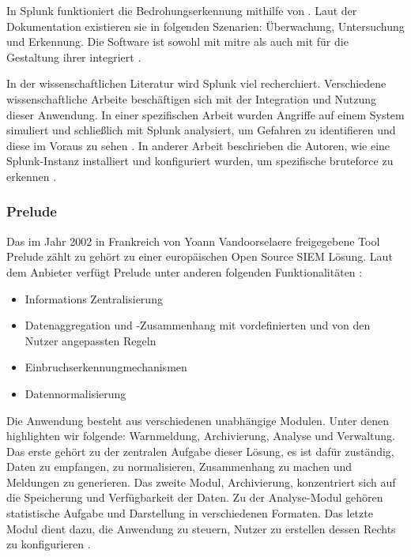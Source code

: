 In Splunk funktioniert die Bedrohungserkennung mithilfe von . Laut der Dokumentation existieren sie in folgenden Szenarien: Überwachung, Untersuchung und Erkennung. Die Software ist sowohl mit \gls{mitre} als auch mit  für die Gestaltung ihrer  integriert \citep{Splunk_usecases}. 

In der wissenschaftlichen Literatur wird Splunk viel recherchiert. Verschiedene wissenschaftliche Arbeite beschäftigen sich mit der Integration und Nutzung dieser Anwendung. In einer spezifischen Arbeit wurden Angriffe auf einem System simuliert und schließlich mit Splunk analysiert, um Gefahren zu identifieren und diese im Voraus zu sehen \citep{Su_SplunkDDOS}. In anderer Arbeit beschrieben die Autoren, wie eine Splunk-Instanz installiert und konfiguriert wurden, um spezifische \gls{bruteforce} zu erkennen \citep{Selvaganesh_SplunkBruteForce}.       





\subsubsection{Prelude}
Das im Jahr 2002 in Frankreich von Yoann Vandoorselaere freigegebene Tool Prelude zählt zu gehört zu einer europäischen \gls{Open Source} \gls{SIEM} Lösung. Laut dem Anbieter verfügt Prelude unter anderen folgenden Funktionalitäten \citep{Prelude_SIEM}:

\begin{itemize}[noitemsep]
   \item Informations Zentralisierung 
   \item Datenaggregation und -Zusammenhang mit vordefinierten und von den Nutzer angepassten Regeln 
   \item Einbruchserkennungmechanismen
   \item Datennormalisierung
\end{itemize}

Die Anwendung besteht aus verschiedenen unabhängige Modulen. Unter denen highlighten wir folgende: Warnmeldung, Archivierung, Analyse und Verwaltung. Das erste gehört zu der zentralen Aufgabe dieser Lösung, es ist dafür zuständig, Daten zu empfangen, zu normalisieren, Zusammenhang zu machen und Meldungen zu generieren. Das zweite Modul, Archivierung, konzentriert sich auf die Speicherung und Verfügbarkeit der Daten. Zu der Analyse-Modul gehören statistische Aufgabe und Darstellung in verschiedenen Formaten. Das letzte Modul dient dazu, die Anwendung zu steuern, Nutzer zu erstellen dessen Rechts zu konfigurieren \citep{EC_Prelude}.

